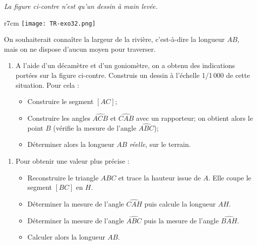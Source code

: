 
{\em La figure ci-contre n'est qu'un     dessin à main levée.}

\begin{wrapfigure}[7]{r}{7cm}
\vspace{-7mm}
\texttt{[image: TR-exo32.png]} 
\end{wrapfigure}   

    
    On souhaiterait connaître la largeur de la
  rivière, c'est-à-dire la longueur $AB$, mais on ne dispose d'aucun
  moyen pour traverser.

  \begin{enumerate}
    \item A l'aide d'un décamètre et d'un goniomètre, on a obtenu des
      indications portées sur la figure ci-contre. Construis un dessin
      à l'échelle 1/1\,000 de cette situation. Pour cela :
      \begin{itemize}
      \item Construire le segment $[AC]$;
      \item Construire les angles $\widehat{ACB}$ et $\widehat{CAB}$
        avec un rapporteur;
       on obtient alors le point $B$ (vérifie la mesure de
        l'angle $\widehat{ABC}$);
      \item Déterminer alors la longueur $AB$ {\em réelle}, sur le terrain.
      \end{itemize}
  \end{enumerate}

\begin{enumerate}
    \item Pour obtenir une valeur plus précise :
      \begin{itemize}
      \item Reconstruire le triangle $ABC$ et trace la hauteur issue de
        $A$. Elle coupe le segment $[BC]$ en $H$.
      \item Déterminer la mesure de l'angle $\widehat{CAH}$ puis
        calcule la longueur $AH$.
      \item Déterminer la mesure de l'angle $\widehat{ABC}$ puis la
        mesure de l'angle $\widehat{BAH}$.
      \item Calculer alors la longueur $AB$.
      \end{itemize}
  \end{enumerate}
 